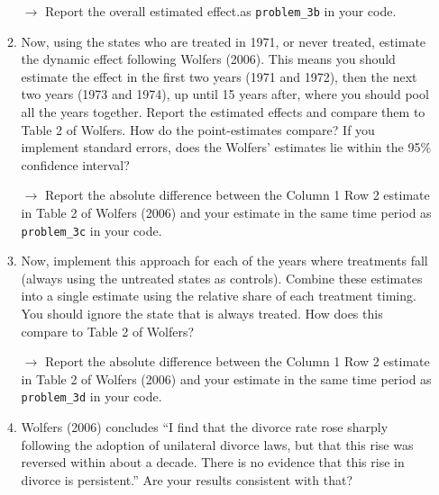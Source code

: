 \documentclass[11pt, a4paper]{article}
\begin{document}
\begin{enumerate}
\begin{enumerate}
      \hspace{10pt} $\rightarrow$ Report the overall estimated effect.as \texttt{problem\_3b} in your code. 
      \item Now, using the states who are treated in 1971, or never treated, estimate the dynamic effect following Wolfers (2006). This means you should estimate the effect in the first two years (1971 and 1972), then the next two years (1973 and 1974), up until 15 years after, where you should pool all the years together. Report the estimated effects and compare them to Table 2 of Wolfers. How do the point-estimates compare? If you implement standard errors, does the Wolfers' estimates lie within the 95\% confidence interval?
      
      \hspace{10pt} $\rightarrow$ Report the absolute difference between the Column 1 Row 2 estimate in Table 2 of Wolfers (2006) and your estimate in the same time period as \texttt{problem\_3c} in your code. 
      \item Now, implement this approach for each of the years where treatments fall (always using the untreated states as controls). Combine these estimates into a single estimate using the relative share of each treatment timing. You should ignore the state that is always treated. How does this compare to Table 2 of Wolfers? 
      
      \hspace{10pt} $\rightarrow$ Report the absolute difference between the Column 1 Row 2 estimate in Table 2 of Wolfers (2006) and your estimate in the same time period as \texttt{problem\_3d} in your code. 
      \item Wolfers (2006) concludes ``I find that the divorce rate rose sharply following the adoption of unilateral divorce laws, but that this rise was reversed within about a decade. There is no evidence that this rise in divorce is persistent.'' Are your results consistent with that?
    \end{enumerate}
\end{enumerate}
\end{document}
